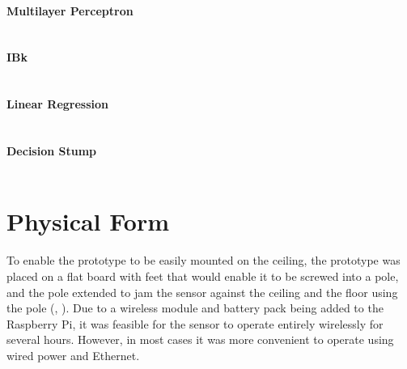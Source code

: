 \subsubsection{Multilayer Perceptron}
\inputminted[fontsize=\footnotesize,breaklines=true]{text}{../data/processed/third/numeric-multilayer-perceptron.txt}
\clearpage

\subsubsection{IBk}
\inputminted[fontsize=\footnotesize,breaklines=true]{text}{../data/processed/third/numeric-ibk-1.txt}
\clearpage

\subsubsection{Linear Regression}
\inputminted[fontsize=\footnotesize,breaklines=true]{text}{../data/processed/third/numeric-linear-reg.txt}
\clearpage

\subsubsection{Decision Stump}
\inputminted[fontsize=\footnotesize,breaklines=true]{text}{../data/processed/third/numeric-decision-stump.txt}

\chapter{Physical Form}
To enable the prototype to be easily mounted on the ceiling, the prototype was placed on a flat board with feet that would enable it to be screwed into a pole, and the pole extended to jam the sensor against the ceiling and the floor using the pole (, ). Due to a wireless module and battery pack being added to the Raspberry Pi, it was feasible for the sensor to operate entirely wirelessly for several hours. However, in most cases it was more convenient to operate using wired power and Ethernet.

